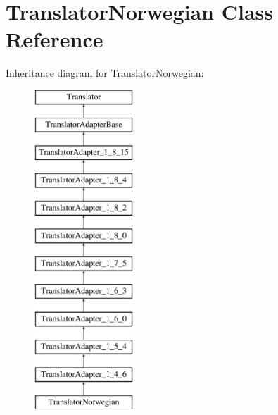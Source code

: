 \hypertarget{class_translator_norwegian}{}\section{Translator\+Norwegian Class Reference}
\label{class_translator_norwegian}
Inheritance diagram for Translator\+Norwegian\+:\begin{figure}[H]
\begin{center}
\leavevmode
\includegraphics[height=12.000000cm]{class_translator_norwegian}
\end{center}
\end{figure}
